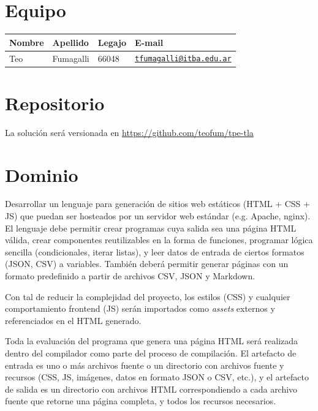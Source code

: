 





\tableofcontents
\pagebreak

\section{Equipo}

\begin{table}[H]
	\centering
	\begin{tabular}{|l|l|l|l|}
		\hline
		\textbf{Nombre} & \textbf{Apellido} & \textbf{Legajo} & \textbf{E-mail} \\
		\hline
		Teo             & Fumagalli         & 66048           & \href{mailto:tfumagalli@itba.edu.ar}{\texttt{tfumagalli@itba.edu.ar}} \\
		\hline
	\end{tabular}
\end{table}

\section{Repositorio}

La solución será versionada en \href{https://github.com/teofum/tpe-tla}{https://github.com/teofum/tpe-tla}

\section{Dominio}

Desarrollar un lenguaje para generación de sitios web estáticos (HTML + CSS +
JS) que puedan ser hosteados por un servidor web estándar (e.g. Apache, nginx).
El lenguaje debe permitir crear programas cuya salida sea una página HTML
válida, crear componentes reutilizables en la forma de funciones, programar
lógica sencilla (condicionales, iterar listas), y leer datos de entrada de
ciertos formatos (JSON, CSV) a variables. También deberá permitir generar
páginas con un formato predefinido a partir de archivos CSV, JSON y Markdown.

Con tal de reducir la complejidad del proyecto, los estilos (CSS) y cualquier
comportamiento frontend (JS) serán importados como \textit{assets} externos y
referenciados en el HTML generado.

Toda la evaluación del programa que genera una página HTML será realizada dentro
del compilador como parte del proceso de compilación. El artefacto de entrada es
uno o más archivos fuente o un directorio con archivos fuente y recursos (CSS,
JS, imágenes, datos en formato JSON o CSV, etc.), y el artefacto de salida es un
directorio con archivos HTML correspondiendo a cada archivo fuente que retorne
una página completa, y todos los recursos necesarios.


